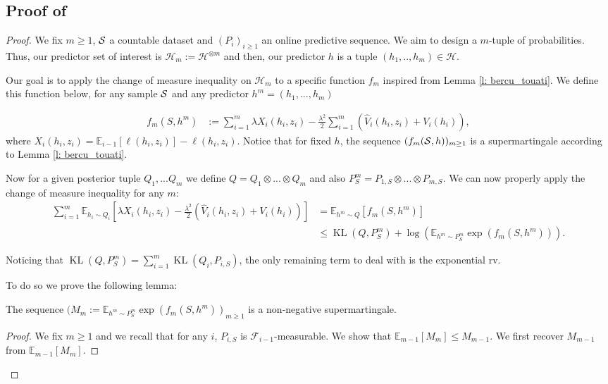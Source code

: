 \subsection{Proof of }
\label{sec: proof_main_thm_online-ht}
 \begin{proof}
   We fix $m\geq 1$, $\S$ a countable dataset and $(P_i)_{i\geq 1}$ an online predictive sequence. We aim to design a $m$-tuple of probabilities. Thus, our predictor set of interest is $\mathcal{H}_m:= \mathcal{H}^{\otimes m}$ and then, our predictor $h$ is a tuple $(h_1,..,h_m)\in\mathcal{H}$.

   Our goal is to apply the change of measure inequality on $\mathcal{H}_m$ to a specific function $f_m$ inspired from Lemma \ref{l: bercu_touati}. We define this function below, for any sample $\S$ and any predictor $h^m=(h_1,...,h_m)$

   \begin{align*}
   f_m(S,h^m) & := \sum_{i=1}^m \lambda X_i(h_i,z_i)  - \frac{\lambda^2}{2}\sum_{i=1}^m(\hat{V}_i(h_i,z_i) + V_i(h_i)),
   \end{align*}
   where $X_i(h_i,z_i)= \mathbb{E}_{i-1}[\ell(h_i,z_i)]- \ell(h_i,z_i)$. Notice that for fixed $h$, the sequence $(f_m(\S,h))_{m\geq 1}$ is a supermartingale according to Lemma \ref{l: bercu_touati}.

   Now for a given posterior tuple $Q_1,...Q_m$ we define $Q= Q_1 \otimes ...\otimes Q_m$ and also $P^m_S = P_{1,S}\otimes...\otimes P_{m,S}$. We can now properly apply the change of measure inequality for any $m$:
   \begin{align*}
    \sum_{i=1}^m \mathbb{E}_{h_i\sim Q_i}[\lambda X_i(h_i,z_i)  - \frac{\lambda^2}{2}(\hat{V}_i(h_i,z_i) + V_i(h_i))] & = \mathbb{E}_{h^m\sim Q}\left[ f_m(S,h^m) \right] \\
    & \leq \operatorname{KL}(Q,P^m_S) + \log \left( \mathbb{E}_{h^m\sim P^m_S}\exp(f_m(S,h^m))  \right).
   \end{align*}

   Noticing that $\operatorname{KL}(Q,P^m_S)= \sum_{i=1}^m \operatorname{KL}(Q_i,P_{i,S})$, the only remaining term to deal with is the exponential rv.

   To do so we prove the following lemma:

   \begin{lemma}
     The sequence $(M_m:=\mathbb{E}_{h^m\sim P^m_S}\exp(f_m(S,h^m))_{m\geq 1}$ is a non-negative supermartingale.
   \end{lemma}
   \begin{proof}
   We fix $m\geq 1$ and we recall that for any $i$, $P_{i,S}$ is $\mathcal{F}_{i-1}$-measurable. We show that $\mathbb{E}_{m-1}[M_m] \leq M_{m-1}$. We first recover $M_{m-1}$ from $\mathbb{E}_{m-1}[M_m]$.


\end{proof}
\end{proof}
